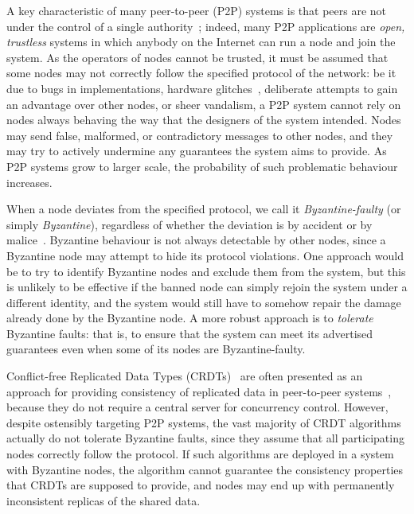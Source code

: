 \documentclass[sigplan,review]{acmart}
\begin{document}
A key characteristic of many peer-to-peer (P2P) systems is that peers are not under the control of a single authority~\cite{Buford:2010}; indeed, many P2P applications are \emph{open, trustless} systems in which anybody on the Internet can run a node and join the system.
As the operators of nodes cannot be trusted, it must be assumed that some nodes may not correctly follow the specified protocol of the network: be it due to bugs in implementations, hardware glitches~\cite{Hochschild:2021}, deliberate attempts to gain an advantage over other nodes, or sheer vandalism, a P2P system cannot rely on nodes always behaving the way that the designers of the system intended.
Nodes may send false, malformed, or contradictory messages to other nodes, and they may try to actively undermine any guarantees the system aims to provide.
As P2P systems grow to larger scale, the probability of such problematic behaviour increases.

When a node deviates from the specified protocol, we call it \emph{Byzantine-faulty} (or simply \emph{Byzantine}), regardless of whether the deviation is by accident or by malice~\cite{Lamport:1982}.
Byzantine behaviour is not always detectable by other nodes, since a Byzantine node may attempt to hide its protocol violations.
One approach would be to try to identify Byzantine nodes and exclude them from the system, but this is unlikely to be effective if the banned node can simply rejoin the system under a different identity, and the system would still have to somehow repair the damage already done by the Byzantine node.
A more robust approach is to \emph{tolerate} Byzantine faults: that is, to ensure that the system can meet its advertised guarantees even when some of its nodes are Byzantine-faulty.

Conflict-free Replicated Data Types (CRDTs)~\cite{Shapiro:2011} are often presented as an approach for providing consistency of replicated data in peer-to-peer systems~\cite{vanderLinde:2017fu,Weiss:2009ht,Nicolaescu:2016}, because they do not require a central server for concurrency control.
However, despite ostensibly targeting P2P systems, the vast majority of CRDT algorithms actually do not tolerate Byzantine faults, since they assume that all participating nodes correctly follow the protocol.
If such algorithms are deployed in a system with Byzantine nodes, the algorithm cannot guarantee the consistency properties that CRDTs are supposed to provide, and nodes may end up with permanently inconsistent replicas of the shared data.
\end{document}
